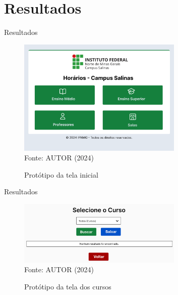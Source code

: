 \section{Resultados}

\begin{frame}{Resultados}
    \begin{figure}
        \centering
        \vspace{-0.5cm}
        \caption{Protótipo da tela inicial}
        \vspace{-0.2cm}
        \includegraphics[width=0.7\textwidth]{figuras/proto-1.png}
        \\ %
        \small Fonte: AUTOR (2024)
    \end{figure}
\end{frame}

\begin{frame}{Resultados}
    \begin{figure}
        \centering
        \vspace{-0.5cm}
        \caption{Protótipo da tela dos cursos}
        \vspace{-0.2cm}
        \includegraphics[width=0.7\textwidth]{figuras/proto-2.png}
        \\ %
        \small Fonte: AUTOR (2024)
    \end{figure}
\end{frame}


